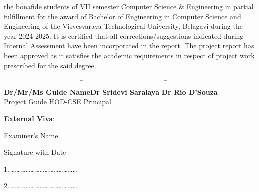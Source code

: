 \documentclass[12pt,a4paper]{report}
\begin{document}
\noindent
the bonafide students of VII semester Computer Science \& Engineering in partial fulfillment for the award of Bachelor of Engineering in Computer Science and Engineering of the Visvesvaraya Technological University, Belagavi during the year 2024-2025. It is certified that all corrections/suggestions indicated during Internal Assessment have been incorporated in the report. The project report has been approved as it satisfies the academic requirements in respect of project work prescribed for the said degree. 

\par
\vspace{0.33in}
\begin{tabbing}
---------------------------------\hspace{0.3in}\=----------------------------------- \hspace{0.3in}\=--------------------------------- \\
\textbf{Dr/Mr/Ms Guide Name}\>\hspace{0.3in}\textbf{Dr Sridevi Saralaya }\>\hspace{0.3in}\textbf{Dr Rio D'Souza}\\
\hspace{0.5in}Project Guide\>\hspace{0.50in} HOD-CSE \>\hspace{0.6in}Principal
\end{tabbing}

\begin{center}
\large \textbf{External Viva}:
\end{center}
\begin{flushleft}
\begin{normalsize}Examiner's Name \end{normalsize}
\hspace{6.5cm}
\begin{normalsize}Signature with Date\end{normalsize}
\end{flushleft}
\vspace{0.1in}
\begin{flushleft}
1. \ldots\ldots\ldots\ldots\ldots\ldots \ldots \hspace{5.8cm}\ldots\ldots\ldots\ldots \ldots\ldots\ldots 
\par
\vspace{0.2in}	
2. \ldots\ldots\ldots\ldots\ldots\ldots \ldots \hspace{5.8cm}\ldots\ldots\ldots\ldots \ldots\ldots\ldots 
\end{flushleft}
\newpage
\end{document}
